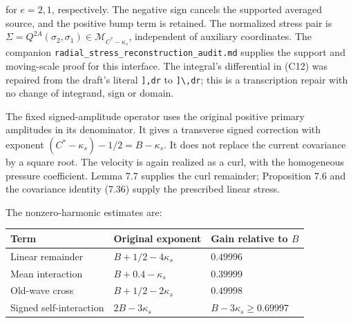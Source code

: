 \documentclass[10pt,a4paper]{article}
\newcounter{none}
\begin{document}
for \(e=2,1\), respectively. The negative sign cancels the supported averaged source, and the positive bump term is retained. The normalized stress pair is \(\Sigma=Q^{2A}(\sigma_2,\sigma_1)\in\mathcal M_{C^*-\kappa_s}\), independent of auxiliary coordinates. The companion \texttt{r\allowbreak{}a\allowbreak{}d\allowbreak{}i\allowbreak{}a\allowbreak{}l\allowbreak{}\_\allowbreak{}s\allowbreak{}t\allowbreak{}r\allowbreak{}e\allowbreak{}s\allowbreak{}s\allowbreak{}\_\allowbreak{}r\allowbreak{}e\allowbreak{}c\allowbreak{}o\allowbreak{}n\allowbreak{}s\allowbreak{}t\allowbreak{}r\allowbreak{}u\allowbreak{}c\allowbreak{}t\allowbreak{}i\allowbreak{}o\allowbreak{}n\allowbreak{}\_\allowbreak{}a\allowbreak{}u\allowbreak{}d\allowbreak{}i\allowbreak{}t\allowbreak{}.\allowbreak{}m\allowbreak{}d} supplies the support and moving-scale proof for this interface. The integral's differential in (C12) was repaired from the draft's literal \texttt{],dr\textquotesingle{}} to \texttt{]\textbackslash{},dr\textquotesingle{}}; this is a transcription repair with no change of integrand, sign or domain.

The fixed signed-amplitude operator uses the original positive primary amplitudes in its denominator. It gives a transverse signed correction with exponent \((C^*-\kappa_s)-1/2=B-\kappa_s\). It does not replace the current covariance by a square root. The velocity is again realized as a curl, with the homogeneous pressure coefficient. Lemma 7.7 supplies the curl remainder; Proposition 7.6 and the covariance identity (7.36) supply the prescribed linear stress.

The nonzero-harmonic estimates are:

{\def\LTcaptype{none} %
\begin{longtable}[]{@{}
  >{\raggedright\arraybackslash}p{}
  >{\raggedright\arraybackslash}p{}
  >{\raggedright\arraybackslash}p{}@{}}
\toprule\noalign{}
\begin{minipage}[b]{\linewidth}\raggedright
Term
\end{minipage} & \begin{minipage}[b]{\linewidth}\raggedright
Original exponent
\end{minipage} & \begin{minipage}[b]{\linewidth}\raggedright
Gain relative to \(B\)
\end{minipage} \\
\midrule\noalign{}
\endhead
\bottomrule\noalign{}
\endlastfoot
Linear remainder & \(B+1/2-4\kappa_s\) & \(0.49996\) \\
Mean interaction & \(B+0.4-\kappa_s\) & \(0.39999\) \\
Old-wave cross & \(B+1/2-2\kappa_s\) & \(0.49998\) \\
Signed self-interaction & \(2B-3\kappa_s\) & \(B-3\kappa_s\ge0.69997\) \\
\end{longtable}
}
\end{document}
